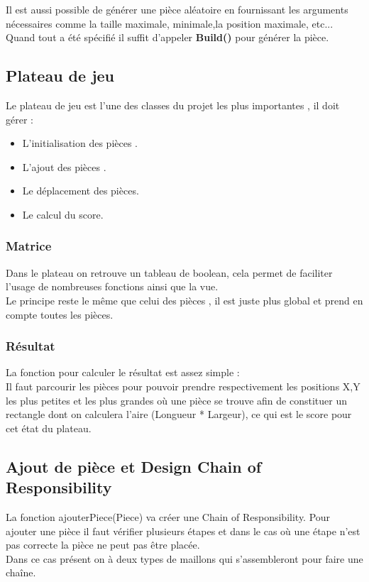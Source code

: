 \documentclass[a4paper,12pt]{article} %
\begin{document}
Il est aussi possible de générer une pièce aléatoire en fournissant les arguments nécessaires comme la taille maximale, minimale,la position maximale, etc... \\
Quand tout a été spécifié il suffit d'appeler \textbf{Build()} pour générer la pièce.

\subsection{Plateau de jeu}
Le plateau de jeu est l'une des classes du projet les plus importantes , il doit gérer :
\begin{itemize}
    \item L'initialisation des pièces .
    \item L'ajout des pièces .
    \item Le déplacement des pièces.
    \item Le calcul du score.
\end{itemize}
\subsubsection{Matrice}
Dans le plateau on retrouve un tableau de boolean, cela permet de faciliter l'usage de nombreuses fonctions ainsi que la vue.\\
Le principe reste le même que celui des pièces , il est juste plus global et prend en compte toutes les pièces. 
\subsubsection{Résultat}
La fonction pour calculer le résultat est assez simple :\\
Il faut parcourir les pièces pour pouvoir prendre respectivement les positions X,Y les plus petites et les plus grandes où une pièce se trouve afin de constituer un rectangle dont on calculera l'aire (Longueur * Largeur), ce qui est le score pour cet état du plateau.
\subsection{Ajout de pièce et Design Chain of Responsibility}
\label{design chain}
La fonction ajouterPiece(Piece) va créer une Chain of Responsibility. 
Pour ajouter une pièce il faut vérifier plusieurs étapes et dans le cas où une étape n'est pas correcte la pièce ne peut pas être placée.\\
Dans ce cas présent on à deux types de maillons qui s'assembleront pour faire une chaîne.
\end{document}
